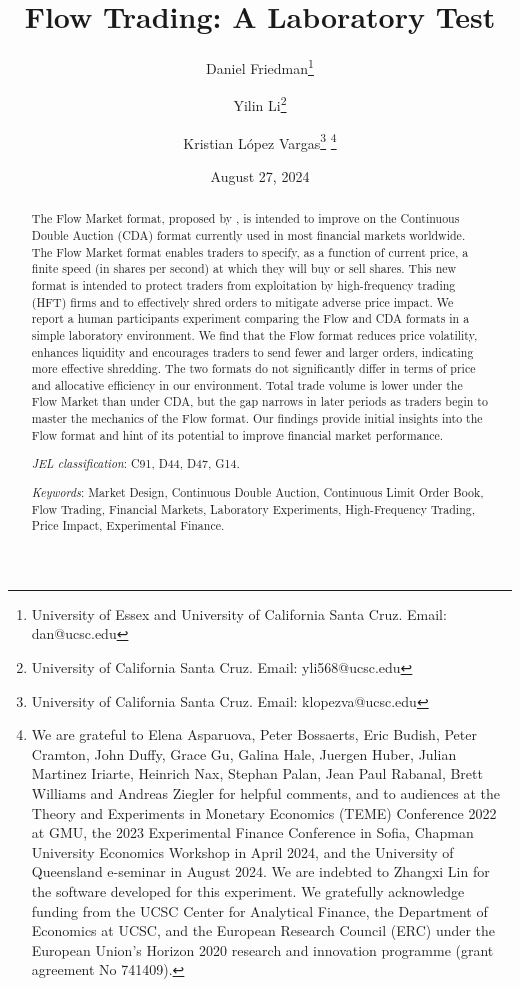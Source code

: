\documentclass[12pt]{article}
\title{Flow Trading: A Laboratory Test}
\author{
  Daniel Friedman\thanks{
  University of Essex and University of California Santa Cruz. Email: dan@ucsc.edu} 
\and
  Yilin Li\thanks{
  University of California Santa Cruz. Email: yli568@ucsc.edu} 
\and
  Kristian L\'opez Vargas\thanks{
  University of California Santa Cruz. Email: klopezva@ucsc.edu}
  \thanks{
We are grateful to Elena Asparuova, Peter Bossaerts, Eric Budish, Peter Cramton, John Duffy,  Grace Gu, Galina Hale, Juergen Huber, Julian Martinez Iriarte, Heinrich Nax, Stephan Palan,  Jean Paul Rabanal, Brett Williams and  Andreas Ziegler
for helpful comments,  
and to audiences at the Theory and Experiments in Monetary Economics (TEME) Conference 2022 at GMU, the 2023 Experimental Finance Conference in Sofia, Chapman University Economics Workshop in April 2024, and the University of Queensland e-seminar in August 2024.
We are indebted to Zhangxi Lin for the software developed for this experiment. We
gratefully acknowledge funding from the UCSC Center for Analytical Finance, the Department of Economics at UCSC, and the European Research Council (ERC) under the European Union’s Horizon 2020 research and innovation programme (grant agreement No 741409).}
}
\date{August 27, 2024}
\begin{document}
\maketitle

\vspace{-.4in}
\begin{abstract}
\begin{singlespace}
The Flow Market format, proposed by \cite{Kyle2017}, is intended to improve on the Continuous Double Auction (CDA) format currently used in most financial markets worldwide. 
The Flow Market format enables traders to specify, as a function of current price, a finite speed (in shares per second) at which they will buy or sell shares. 
This new format is intended to protect traders from exploitation by high-frequency trading (HFT) firms and to effectively shred orders to mitigate adverse price impact. 
We report a human participants experiment comparing the Flow and CDA formats in a simple laboratory environment.
We find that the Flow format reduces price volatility, enhances liquidity and encourages traders to send fewer and larger orders, indicating more effective shredding. The two formats do not significantly differ in terms of price and allocative efficiency in our environment. %
Total trade volume is lower under the Flow Market than under CDA, but the gap narrows in later periods as traders begin to master the mechanics of the Flow format. 
Our findings provide initial insights into the Flow format and hint of its potential to improve financial market performance.

\noindent\textit{JEL classification}: C91, D44, D47, G14.

\noindent \textit{Keywords}: Market Design, Continuous Double Auction, Continuous Limit Order Book, Flow Trading, Financial Markets, Laboratory Experiments, High-Frequency Trading, Price Impact, Experimental Finance.

\end{singlespace}
\end{abstract}

\end{document}
